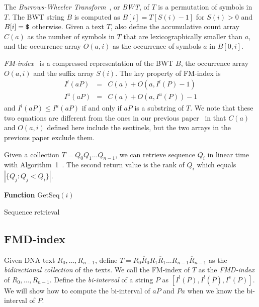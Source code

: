 \documentclass{bioinfo}
\begin{document}
\begin{methods}
The \emph{Burrows-Wheeler Transform}~\citep{Burrows:1994gd}, or \emph{BWT}, of $T$ is a permutation of
symbols in $T$. The BWT string $B$ is computed as $B[i]=T[S(i)-1]$ for
$S(i)>0$ and $B[i]=\mbox{\tt \$}$ otherwise. Given a text $T$, also define
the accumulative count array $C(a)$ as the number of symbols in $T$ that are
lexicographically smaller than $a$, and the occurrence array $O(a,i)$ as
the occurrence of symbols $a$ in $B[0,i]$.

\emph{FM-index}~\citep{DBLP:conf/focs/FerraginaM00} is a compressed representation of the BWT $B$, the occurrence
array $O(a,i)$ and the suffix array $S(i)$. The key property of FM-index is
\begin{eqnarray}\label{eq:back}
I^l(aP)&=&C(a)+O(a,I^l(P)-1)\\
I^u(aP)&=&C(a)+O(a,I^u(P))-1
\end{eqnarray}
and $I^l(aP)\le I^u(aP)$ if and only if $aP$ is a substring of $T$.
We note that these two equations are different from the ones in our previous
paper~\citep{Li:2009uq} in that $C(a)$ and $O(a,i)$ defined here include
the sentinels, but the two arrays in the previous paper exclude them.

Given a collection $T=Q_0 Q_1\ldots Q_{n-1}$, we can retrieve
sequence $Q_i$ in linear time with Algorithm~1~\citep{DBLP:conf/recomb/MakinenNSV09}.
The second return value is the rank of $Q_i$ which equals $|\{Q_j:Q_j<Q_i\}|$.

\begin{algorithm}[h]
\DontPrintSemicolon
\footnotesize
{}
\BlankLine
\textbf{Function} {\sc GetSeq}$(i)$
\caption{Sequence retrieval}
\end{algorithm}

\subsection{FMD-index}

Given DNA text $R_0,\ldots,R_{n-1}$, define $T=R_0\overline{R}_0
R_1\overline{R}_1\ldots R_{n-1}\overline{R}_{n-1}$ as the
\emph{bidirectional collection} of the texts. We call the FM-index of $T$ as
the \emph{FMD-index} of $R_0,\ldots,R_{n-1}$.  Define the \emph{bi-interval} of a
string $P$ as $[I^l(P),I^l(\overline{P}),I^s(P)]$. We will show how to compute
the bi-interval of $aP$ and $Pa$ when we know the bi-interval of $P$.


\end{methods}
\end{document}
